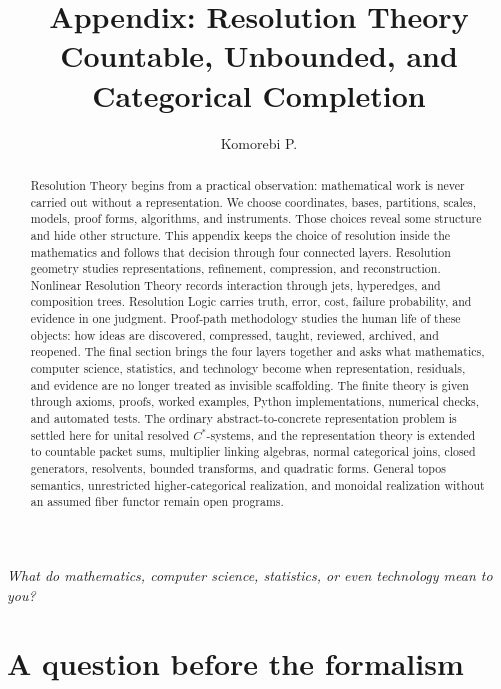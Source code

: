 \documentclass[11pt]{article}
\title{Appendix: Resolution Theory\\
\large Countable, Unbounded, and Categorical Completion}
\author{Komorebi P.}
\date{}
\theoremstyle{definition}
\theoremstyle{remark}
\begin{document}
\maketitle
\begin{center}
\Large\itshape
What do mathematics, computer science, statistics, or even technology mean to you?
\end{center}

\vspace{0.4em}

\begin{abstract}
Resolution Theory begins from a practical observation: mathematical work is never carried out without a representation.  We choose coordinates, bases, partitions, scales, models, proof forms, algorithms, and instruments.  Those choices reveal some structure and hide other structure.  This appendix keeps the choice of resolution inside the mathematics and follows that decision through four connected layers.  Resolution geometry studies representations, refinement, compression, and reconstruction.  Nonlinear Resolution Theory records interaction through jets, hyperedges, and composition trees.  Resolution Logic carries truth, error, cost, failure probability, and evidence in one judgment.  Proof-path methodology studies the human life of these objects: how ideas are discovered, compressed, taught, reviewed, archived, and reopened.  The final section brings the four layers together and asks what mathematics, computer science, statistics, and technology become when representation, residuals, and evidence are no longer treated as invisible scaffolding.  The finite theory is given through axioms, proofs, worked examples, Python implementations, numerical checks, and automated tests.  The ordinary abstract-to-concrete representation problem is settled here for unital resolved $C^*$-systems, and the representation theory is extended to countable packet sums, multiplier linking algebras, normal categorical joins, closed generators, resolvents, bounded transforms, and quadratic forms.  General topos semantics, unrestricted higher-categorical realization, and monoidal realization without an assumed fiber functor remain open programs.
\end{abstract}
\tableofcontents
\clearpage
\section*{A question before the formalism}
\end{document}
